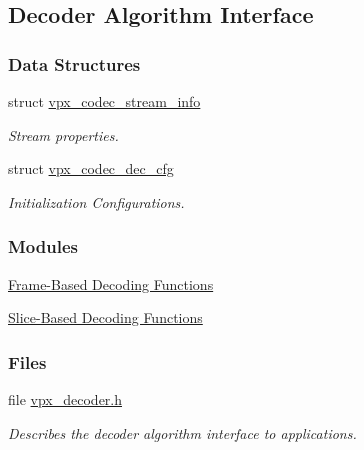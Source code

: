 \hypertarget{group__decoder}{
\subsection{\-Decoder \-Algorithm \-Interface}
\label{group__decoder}
}
\subsubsection*{\-Data \-Structures}
\begin{DoxyCompactItemize}
\item 
struct \hyperlink{structvpx__codec__stream__info}{vpx\-\_\-codec\-\_\-stream\-\_\-info}
\begin{DoxyCompactList}\small\item\em \-Stream properties. \end{DoxyCompactList}\item 
struct \hyperlink{structvpx__codec__dec__cfg}{vpx\-\_\-codec\-\_\-dec\-\_\-cfg}
\begin{DoxyCompactList}\small\item\em \-Initialization \-Configurations. \end{DoxyCompactList}\end{DoxyCompactItemize}
\subsubsection*{\-Modules}
\begin{DoxyCompactItemize}
\item 
\hyperlink{group__cap__put__frame}{\-Frame-\/\-Based Decoding Functions}
\item 
\hyperlink{group__cap__put__slice}{\-Slice-\/\-Based Decoding Functions}
\end{DoxyCompactItemize}
\subsubsection*{\-Files}
\begin{DoxyCompactItemize}
\item 
file \hyperlink{vpx__decoder_8h}{vpx\-\_\-decoder.\-h}
\begin{DoxyCompactList}\small\item\em \-Describes the decoder algorithm interface to applications. \end{DoxyCompactList}\end{DoxyCompactItemize}
